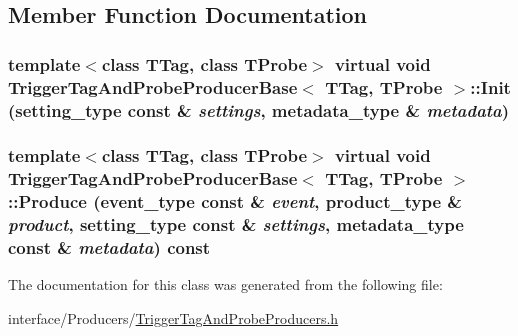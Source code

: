 \subsection{Member Function Documentation}
\hypertarget{classTriggerTagAndProbeProducerBase_a4f9cd9ab107167a635112c38cf2b416c}{
\subsubsection[{Init}]{\setlength{\rightskip}{0pt plus 5cm}template$<$class TTag, class TProbe$>$ virtual void {\bf TriggerTagAndProbeProducerBase}$<$ TTag, TProbe $>$::Init (setting\_\-type const \& {\em settings}, \/  metadata\_\-type \& {\em metadata})}}
\label{classTriggerTagAndProbeProducerBase_a4f9cd9ab107167a635112c38cf2b416c}
\hypertarget{classTriggerTagAndProbeProducerBase_a310f761a30108b660bf8232fdf398e3c}{
\subsubsection[{Produce}]{\setlength{\rightskip}{0pt plus 5cm}template$<$class TTag, class TProbe$>$ virtual void {\bf TriggerTagAndProbeProducerBase}$<$ TTag, TProbe $>$::Produce (event\_\-type const \& {\em event}, \/  product\_\-type \& {\em product}, \/  setting\_\-type const \& {\em settings}, \/  metadata\_\-type const \& {\em metadata}) const}}
\label{classTriggerTagAndProbeProducerBase_a310f761a30108b660bf8232fdf398e3c}


The documentation for this class was generated from the following file:\begin{DoxyCompactItemize}
\item 
interface/Producers/\hyperlink{TriggerTagAndProbeProducers_8h}{TriggerTagAndProbeProducers.h}\end{DoxyCompactItemize}
